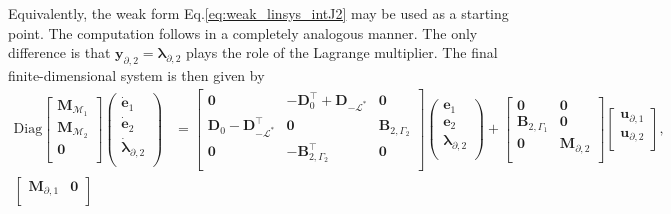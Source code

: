 Equivalently, the weak form Eq.\ref{eq:weak_linsys_intJ2} may be used as a starting point. The computation follows in a completely analogous manner. The only difference is that $\bm{y}_{\partial, 2}=\bm{\lambda}_{\partial, 2}$ plays the role of the Lagrange multiplier. The final finite-dimensional system is then given by
\begin{equation}\label{eq:pHsys_infdim_mult2}
\begin{aligned}
\mathrm{Diag}
\begin{bmatrix}
\mathbf{M}_{\mathcal{M}_1}\\
\mathbf{M}_{\mathcal{M}_2}\\
\mathbf{0}\\
\end{bmatrix}
\begin{pmatrix}
\dot{\mathbf{e}}_{1} \\
\dot{\mathbf{e}}_{2} \\
\dot{\bm{\lambda}}_{\partial, 2} \\
\end{pmatrix}
&= \begin{bmatrix}
\mathbf{0} & -\mathbf{D}_{0}^\top + \mathbf{D}_ {-\mathcal{L}^*} & \mathbf{0}\\
\mathbf{D}_{0} - \mathbf{D}_ {-\mathcal{L}^*}^\top & \mathbf{0} & \mathbf{B}_{2, \Gamma_2} \\
\mathbf{0} & -\mathbf{B}_{2, \Gamma_2}^\top & \mathbf{0}  \\
\end{bmatrix} 
\begin{pmatrix}
\mathbf{e}_{1} \\
\mathbf{e}_{2} \\
{\bm{\lambda}}_{\partial, 2} \\
\end{pmatrix} + 
\begin{bmatrix}
\mathbf{0} & \mathbf{0} \\
 \mathbf{B}_{2, \Gamma_1} & \mathbf{0} \\
\mathbf{0} & \mathbf{M}_{\partial, 2} \\
\end{bmatrix}
\begin{bmatrix}
\mathbf{u}_{\partial, 1} \\
\mathbf{u}_{\partial, 2} \\
\end{bmatrix}, \\
\begin{bmatrix}
\mathbf{M}_{\partial, 1} & \mathbf{0} \\

\end{bmatrix}
\end{aligned}
\end{equation}
